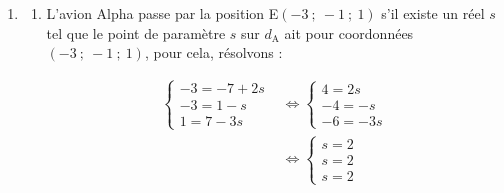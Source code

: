 \documentclass[10pt]{article}
\begin{document}
\begin{enumerate}
\begin{enumerate}
\[
\begin{aligned}
	\begin{cases}
	-11+5t=-7+2s \\
	-5+t=1-s \\
	11-4t=7-3 s
	\end{cases}
	&\iff \begin{cases}
	-11+5 (6-s)=-7+2s \\
	t=6-s \\
	11-4(6-s)=7-3 s
	\end{cases}\\
	&\iff \begin{cases}
	-11+30-5s=-7+2s \\
	t=6-s \\
	11-24+4s=7-3 s
	\end{cases}\\
	&\iff \begin{cases}
	26=7s \\
	t=6-s \\
	7s=20
	\end{cases}\\
	&\iff \begin{cases}
	s=\dfrac{26}{7}\\
	t=6-s \\
	s=\dfrac{20}{7}
	\end{cases}
	\end{aligned}
	\]

Le système n'a pas de  solution, donc les deux avions ne peuvent pas rentrer en collision.
	\end{enumerate}
\item
	\begin{enumerate}
		\item L'avion Alpha passe par la position E$(-3~;~-1~;~1)$  s'il existe un réel $s$  tel que le point de paramètre $s$ sur $d_{\mathrm{A}}$ ait pour coordonnées $(-3~;~-1~;~1)$, pour cela, résolvons :

\[
\begin{aligned}
\begin{cases}
-3=-7+2s \\
-3=1-s \\
1=7-3 s
\end{cases}
	&\iff \begin{cases}
4=2s \\
-4=-s \\
-6=-3 s
\end{cases}\\
	&\iff \begin{cases}
s=2\\
s=2 \\
s=2
	\end{cases}
\end{aligned}
\]


\end{enumerate}
\end{enumerate}
\end{document}
